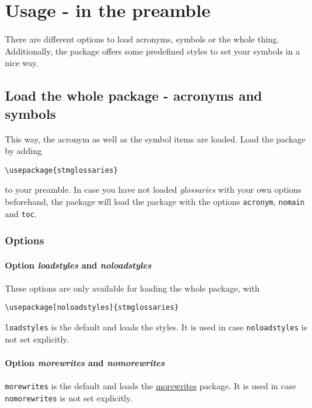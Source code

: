 \documentclass{scrartcl}
\begin{document}
\section{Usage - in the preamble}
\label{sec:usage:preamble}

There are different options to load acronyms, symbols or the whole thing. Additionally, the package offers some predefined styles to set your symbols in a nice way.

\subsection{Load the whole package - acronyms and symbols}
\label{sec:usage:preamble:wholepackage}

This way, the acronym as well as the symbol items are loaded. Load the package by adding

\begin{verbatim}
\usepackage{stmglossaries}
\end{verbatim}

to your preamble. In case you have not loaded \textit{glossaries} with your own options beforehand, the package will load the package with the options \texttt{acronym}, \texttt{nomain} and \texttt{toc}.

\subsubsection{Options}

\paragraph{Option \protect\textit{loadstyles} and \protect\textit{noloadstyles}}

These options are only available for loading the whole package, with

\begin{verbatim}
\usepackage[noloadstyles]{stmglossaries}
\end{verbatim}

\texttt{loadstyles} is the default and loads the styles. It is used in case \texttt{noloadstyles} is not set explicitly.

\paragraph{Option \protect\textit{morewrites} and \protect\textit{nomorewrites}}

\texttt{morewrites} is the default and loads the \href{https://ctan.org/pkg/morewrites?lang=en}{morewrites} package. It is used in case \texttt{nomorewrites} is not set explicitly.
\end{document}
